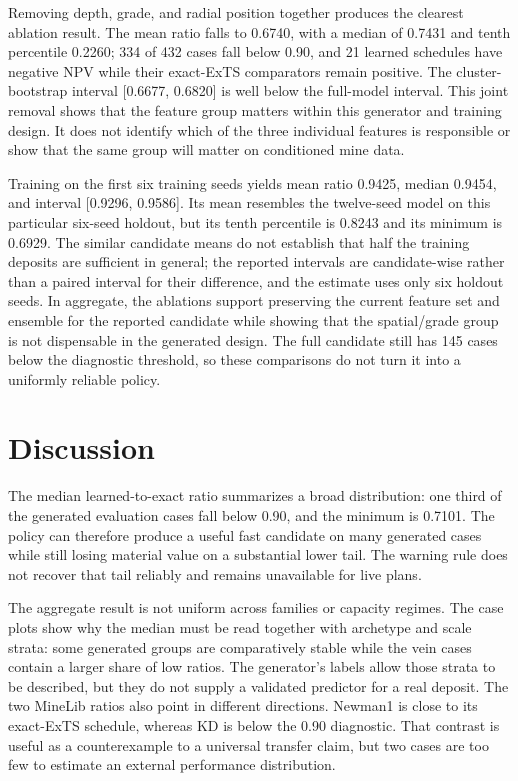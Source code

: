 \documentclass[11pt]{article}
\begin{document}
Removing depth, grade, and radial position together produces the clearest ablation result. The mean ratio falls to 0.6740, with a median of 0.7431 and tenth percentile 0.2260; 334 of 432 cases fall below 0.90, and 21 learned schedules have negative NPV while their exact-ExTS comparators remain positive. The cluster-bootstrap interval [0.6677, 0.6820] is well below the full-model interval. This joint removal shows that the feature group matters within this generator and training design. It does not identify which of the three individual features is responsible or show that the same group will matter on conditioned mine data.

Training on the first six training seeds yields mean ratio 0.9425, median 0.9454, and interval [0.9296, 0.9586]. Its mean resembles the twelve-seed model on this particular six-seed holdout, but its tenth percentile is 0.8243 and its minimum is 0.6929. The similar candidate means do not establish that half the training deposits are sufficient in general; the reported intervals are candidate-wise rather than a paired interval for their difference, and the estimate uses only six holdout seeds. In aggregate, the ablations support preserving the current feature set and ensemble for the reported candidate while showing that the spatial/grade group is not dispensable in the generated design. The full candidate still has 145 cases below the diagnostic threshold, so these comparisons do not turn it into a uniformly reliable policy.



\section{Discussion}
The median learned-to-exact ratio summarizes a broad distribution: one third of the generated evaluation cases fall below 0.90, and the minimum is 0.7101. The policy can therefore produce a useful fast candidate on many generated cases while still losing material value on a substantial lower tail. The warning rule does not recover that tail reliably and remains unavailable for live plans.

The aggregate result is not uniform across families or capacity regimes. The case plots show why the median must be read together with archetype and scale strata: some generated groups are comparatively stable while the vein cases contain a larger share of low ratios. The generator's labels allow those strata to be described, but they do not supply a validated predictor for a real deposit. The two MineLib ratios also point in different directions. Newman1 is close to its exact-ExTS schedule, whereas KD is below the 0.90 diagnostic. That contrast is useful as a counterexample to a universal transfer claim, but two cases are too few to estimate an external performance distribution.
\end{document}

